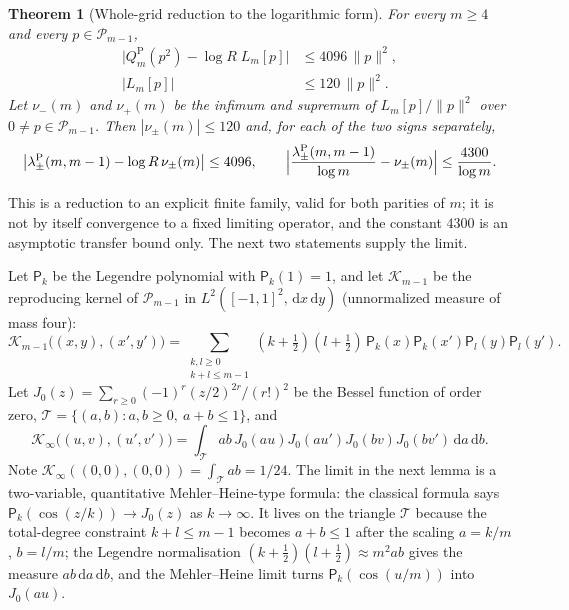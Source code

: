 \documentclass[preprint,12pt,a4paper]{elsarticle}
\newtheorem{theorem}{Theorem}[section]
\theoremstyle{remark}
\newcommand{\Pa}{\mathrm P}
\newcommand{\dd}{\,\mathrm d}
\begin{document}
\begin{theorem}[Whole-grid reduction to the logarithmic form]\label{thm:log-reduction}
For every $m\ge4$ and every $p\in\mathcal P_{m-1}$,
\begin{align}
 \bigl|Q_m^\Pa(p^2)-\log R\;L_m[p]\bigr|&\le4096\,\|p\|^2,\label{eq:log-error}\\
 |L_m[p]|&\le120\,\|p\|^2.\label{eq:L-bound}
\end{align}
Let $\nu_-(m)$ and $\nu_+(m)$ be the infimum and supremum of
$L_m[p]/\|p\|^2$ over $0\ne p\in\mathcal P_{m-1}$. Then
$|\nu_\pm(m)|\le120$ and, for each of the two signs separately,
\begin{equation}\label{eq:log-spectral}
 \bigl|\lambda^\Pa_\pm(m,m-1)-\log R\,\nu_\pm(m)\bigr|\le4096,\qquad
 \Bigl|\frac{\lambda^\Pa_\pm(m,m-1)}{\log m}-\nu_\pm(m)\Bigr|
  \le\frac{4300}{\log m}.
\end{equation}
\end{theorem}

This is a reduction to an explicit finite family, valid for both parities
of $m$; it is not by itself convergence to a fixed limiting operator, and the
constant $4300$ is an asymptotic transfer bound only. The next two
statements supply the limit.

Let $\mathsf P_k$ be the Legendre polynomial with $\mathsf P_k(1)=1$, and
let $\mathcal K_{m-1}$ be the reproducing kernel of $\mathcal P_{m-1}$ in
$L^2([-1,1]^2,\dd x\dd y)$ (unnormalized measure of mass four):
\begin{equation}\label{eq:repro-kernel}
 \mathcal K_{m-1}\bigl((x,y),(x',y')\bigr)=\sum_{\substack{k,l\ge0\\k+l\le m-1}}
  (k+\tfrac12)(l+\tfrac12)\,\mathsf P_k(x)\mathsf P_k(x')\mathsf P_l(y)\mathsf P_l(y').
\end{equation}
Let $J_0(z)=\sum_{r\ge0}(-1)^r(z/2)^{2r}/(r!)^2$ be the Bessel function of
order zero, $\mathcal T=\{(a,b):a,b\ge0,\ a+b\le1\}$, and
\begin{equation}\label{eq:K-infty}
 \mathcal K_\infty\bigl((u,v),(u',v')\bigr)=\int_{\mathcal T}ab\,J_0(au)J_0(au')J_0(bv)J_0(bv')\dd a\dd b .
\end{equation}
Note $\mathcal K_\infty((0,0),(0,0))=\int_{\mathcal T}ab=1/24$.
The limit in the next lemma is a two-variable, quantitative Mehler--Heine-type
formula: the classical formula says $\mathsf P_k(\cos(z/k))\to J_0(z)$ as
$k\to\infty$. It lives on the triangle $\mathcal T$ because the total-degree
constraint $k+l\le m-1$ becomes $a+b\le1$ after the scaling $a=k/m$, $b=l/m$;
the Legendre normalisation $(k+\frac12)(l+\frac12)\approx m^2ab$ gives the
measure $ab\dd a\dd b$, and the Mehler--Heine limit turns
$\mathsf P_k(\cos(u/m))$ into $J_0(au)$.
\end{document}

